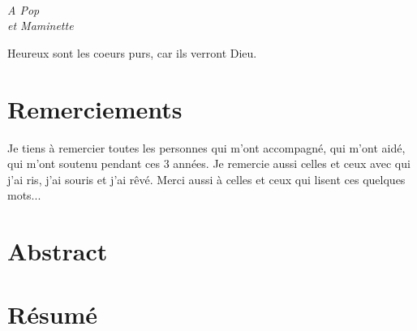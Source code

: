 \documentclass[a4paper]{book}
\begin{document}

\cleardoublepage\normalsize
\ 
\vfill
\begin{FlushRight}\itshape
A Pop\\
et Maminette

\vfill\normalshape
Heureux sont les coeurs purs, car ils verront Dieu. %


\end{FlushRight}

\newpage


\chapter*{Remerciements}
\pagestyle{plain}
Je tiens à remercier toutes les personnes qui m'ont accompagné, qui m'ont aidé, qui m'ont soutenu pendant ces 3 années. Je remercie aussi celles et ceux avec qui j'ai ris, j'ai souris et j'ai rêvé. 
Merci aussi à celles et ceux qui lisent ces quelques mots...


\newpage

\chapter*{Abstract}
  \vspace*{0.5cm}
\begin{mdframed}[linecolor=white]
  \begin{mdframed}[linecolor=white]
  \abstractEN 
\end{mdframed} 
\end{mdframed}






\chapter*{Résumé}
\vspace*{0.5cm}
\begin{mdframed}[linecolor=white]
  \begin{mdframed}[linecolor=white]
\abstractFR
\end{mdframed} 
\end{mdframed}
\end{document}
